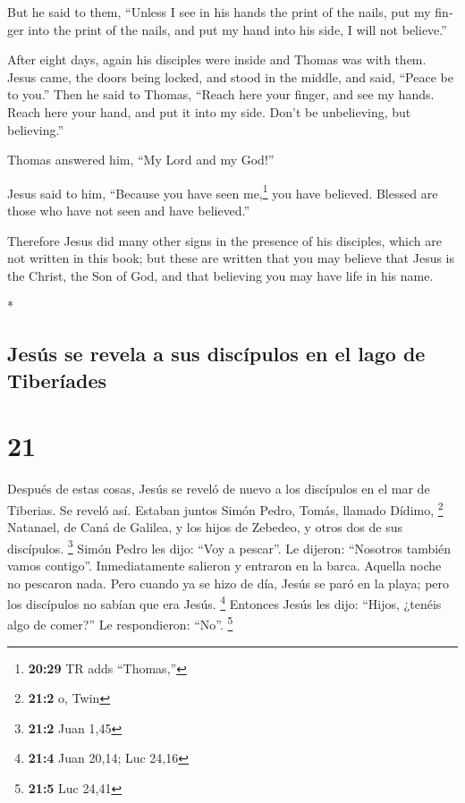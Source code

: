 \begin{paracol}{2}
\begin{otherlanguage}{english}
But he said to them, ``Unless I see in his hands the print of the nails,
put my finger into the print of the nails, and put my hand into his
side, I will not believe.''

 After eight days, again his disciples were inside and
Thomas was with them. Jesus came, the doors being locked, and stood in
the middle, and said, ``Peace be to you.''  Then he said
to Thomas, ``Reach here your finger, and see my hands. Reach here your
hand, and put it into my side. Don't be unbelieving, but believing.''

 Thomas answered him, ``My Lord and my God!''

 Jesus said to him, ``Because you have seen
me,\footnote{\textbf{20:29} TR adds ``Thomas,''} you have believed.
Blessed are those who have not seen and have believed.''

 Therefore Jesus did many other signs in the presence of
his disciples, which are not written in this book;  but
these are written that you may believe that Jesus is the Christ, the Son
of God, and that believing you may have life in his name.

\end{otherlanguage}

\switchcolumn[0]*

\hypertarget{jesuxfas-se-revela-a-sus-discuxedpulos-en-el-lago-de-tiberuxedades}{%
\subsection{Jesús se revela a sus discípulos en el lago de
Tiberíades}\label{jesuxfas-se-revela-a-sus-discuxedpulos-en-el-lago-de-tiberuxedades}}

\hypertarget{section-40}{%
\section{21}\label{section-40}}

 Después de estas cosas, Jesús se reveló de nuevo a los
discípulos en el mar de Tiberias. Se reveló así.  Estaban
juntos Simón Pedro, Tomás, llamado Dídimo, \footnote{\textbf{21:2} o,
  Twin} Natanael, de Caná de Galilea, y los hijos de Zebedeo, y otros
dos de sus discípulos. \footnote{\textbf{21:2} Juan 1,45} 
Simón Pedro les dijo: ``Voy a pescar''. Le dijeron: ``Nosotros también
vamos contigo''. Inmediatamente salieron y entraron en la barca. Aquella
noche no pescaron nada.  Pero cuando ya se hizo de día,
Jesús se paró en la playa; pero los discípulos no sabían que era Jesús.
\footnote{\textbf{21:4} Juan 20,14; Luc 24,16}  Entonces
Jesús les dijo: ``Hijos, ¿tenéis algo de comer?'' Le respondieron:
``No''. \footnote{\textbf{21:5} Luc 24,41}


\end{paracol}
